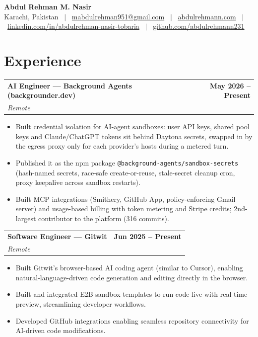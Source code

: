 \documentclass[letterpaper,10pt]{article}
\makeatletter
\newcommand{\ROLEBEFORE}{0pt}\newcommand{\ROLEAFTER}{1.5pt}
\newcommand{\role}[3]{%
  \vspace{\ROLEBEFORE}\begin{tabular*}{\textwidth}{l@{\extracolsep{\fill}}r}
    \textbf{#1} & \textbf{#2} \\
    \textit{#3} & \\
  \end{tabular*}\vspace{\ROLEAFTER}}
\makeatother
\begin{document}
\begin{center}
  {\Huge\bfseries Abdul Rehman M. Nasir}\\[4pt]
  \small Karachi, Pakistan \ $|$ \
  \href{mailto:mabdulrehman951@gmail.com}{mabdulrehman951@gmail.com} \ $|$ \
  \href{https://abdulrehmann.com}{abdulrehmann.com} \ $|$ \
  \href{https://www.linkedin.com/in/abdulrehman-nasir-tobaria}{linkedin.com/in/abdulrehman-nasir-tobaria} \ $|$ \
  \href{https://github.com/abdulrehmann231}{github.com/abdulrehmann231}
\end{center}
\vspace{-6pt}

\section{Experience}

\role{AI Engineer --- Background Agents (backgrounder.dev)}{May 2026 -- Present}{Remote}
\begin{itemize}
  \item Built credential isolation for AI-agent sandboxes: user API keys, shared pool keys and Claude/ChatGPT tokens sit behind Daytona secrets, swapped in by the egress proxy only for each provider's hosts during a metered turn.
  \item Published it as the npm package \texttt{@background-agents/sandbox-secrets} (hash-named secrets, race-safe create-or-reuse, stale-secret cleanup cron, proxy keepalive across sandbox restarts).
  \item Built MCP integrations (Smithery, GitHub App, policy-enforcing Gmail server) and usage-based billing with token metering and Stripe credits; 2nd-largest contributor to the platform (316 commits).
\end{itemize}

\role{Software Engineer --- Gitwit}{Jun 2025 -- Present}{Remote}
\begin{itemize}
  \item Built Gitwit's browser-based AI coding agent (similar to Cursor), enabling natural-language-driven code generation and editing directly in the browser.
  \item Built and integrated E2B sandbox templates to run code live with real-time preview, streamlining developer workflows.
  \item Developed GitHub integrations enabling seamless repository connectivity for AI-driven code modifications.
\end{itemize}
\end{document}
